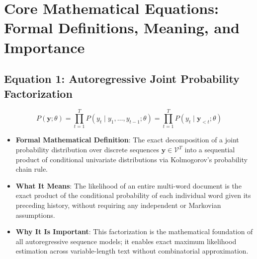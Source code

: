 \documentclass[11pt,a4paper]{article}
\theoremstyle{definition}
\begin{document}
\section{Core Mathematical Equations: Formal Definitions, Meaning, and Importance}

\subsection{\textbf{Equation 1: Autoregressive Joint Probability Factorization}}
{\boldmath
\begin{equation}
P(\mathbf{y}; \theta) = \prod_{t=1}^T P(y_t \mid y_1, \dots, y_{t-1}; \theta) = \prod_{t=1}^T P(y_t \mid \mathbf{y}_{<t}; \theta)
\end{equation}
}
\begin{itemize}
    \item \textbf{Formal Mathematical Definition}:
    The exact decomposition of a joint probability distribution over discrete sequences $\mathbf{y} \in \mathcal{V}^T$ into a sequential product of conditional univariate distributions via Kolmogorov's probability chain rule.
    \item \textbf{What It Means}:
    The likelihood of an entire multi-word document is the exact product of the conditional probability of each individual word given its preceding history, without requiring any independent or Markovian assumptions.
    \item \textbf{Why It Is Important}:
    This factorization is the mathematical foundation of all autoregressive sequence models; it enables exact maximum likelihood estimation across variable-length text without combinatorial approximation.
\end{itemize}
\end{document}
